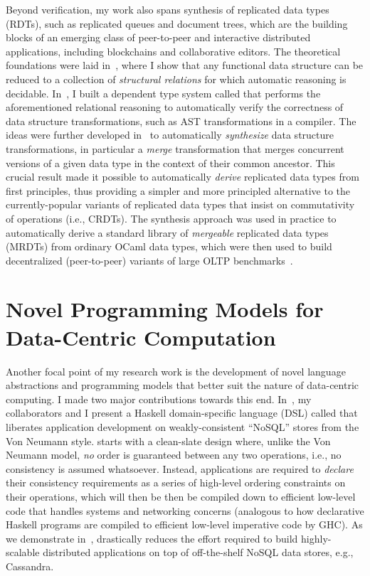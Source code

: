 Beyond verification, my work also spans synthesis of replicated data
types (RDTs), such as replicated queues and document trees, which are
the building blocks of an emerging class of peer-to-peer and
interactive distributed applications, including blockchains and
collaborative editors. The theoretical foundations were laid
in~\cite{icfp14}, where I show that any functional data structure can
be reduced to a collection of \emph{structural relations} for
which automatic reasoning is decidable. In~\cite{icfp14}, I built a
dependent type system called \catalyst that performs the
aforementioned relational reasoning to automatically verify the
correctness of data structure transformations, such as AST
transformations in a compiler. The ideas were further developed
in~\cite{oopsla19} to automatically \emph{synthesize} data structure
transformations, in particular a \emph{merge} transformation that
merges concurrent versions of a given data type in the context of
their common ancestor. This crucial result made it possible to
automatically \emph{derive} replicated data types from first
principles, thus providing a simpler and more principled alternative
to the currently-popular variants of replicated data types that insist
on commutativity of operations (i.e., CRDTs).  The synthesis approach
was used in practice to automatically derive a standard library of \emph{mergeable}
replicated data types (MRDTs) from ordinary OCaml data types, which
were then used to build decentralized (peer-to-peer) variants of large
OLTP benchmarks~\cite{oopsla19}.

\section*{Novel Programming Models for Data-Centric Computation}

Another focal point of my research work is the development of novel
language abstractions and programming models that better suit the
nature of data-centric computing. I made two major contributions
towards this end. In~\cite{pldi15}, my collaborators and I present a
Haskell domain-specific language (DSL) called \quelea that liberates
application development on weakly-consistent ``NoSQL'' stores
from the Von Neumann style. \quelea starts with a clean-slate design
where, unlike the Von Neumann model, \emph{no} order is guaranteed
between any two operations, i.e., no consistency is assumed
whatsoever. Instead, applications are required to \emph{declare} their
consistency requirements as a series of high-level ordering
constraints on their operations, which will then be then be compiled
down to efficient low-level code that handles systems and networking
concerns (analogous to how declarative Haskell programs are compiled
to efficient low-level imperative code by GHC). As we demonstrate
in~\cite{pldi15}, \quelea drastically reduces the effort required to
build highly-scalable distributed applications on top of off-the-shelf
NoSQL data stores, e.g., Cassandra.

